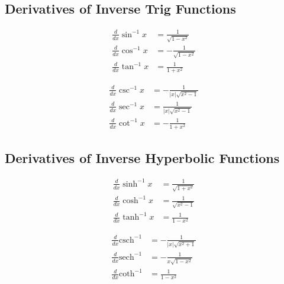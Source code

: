 \documentclass{article}
\begin{document}
\subsection{Derivatives of Inverse Trig Functions} \vspace{-2em}
\begin{multicols}{2}
    \begin{align}
        \frac{d}{dx} \sin^{-1} x &= \frac{1}{\sqrt{1-x^2}}\\
        \frac{d}{dx} \cos^{-1} x &= -\frac{1}{\sqrt{1-x^2}}\\
        \frac{d}{dx} \tan^{-1} x &= \frac{1}{1 + x^2}
    \end{align}

    \begin{align}
        \frac{d}{dx} \csc^{-1} x &= -\frac{1}{|x| \sqrt{x^2-1}}\\
        \frac{d}{dx} \sec^{-1} x &= \frac{1}{|x| \sqrt{x^2-1}}\\
        \frac{d}{dx} \cot^{-1} x &= -\frac{1}{1 + x^2}
    \end{align}    
\end{multicols}

\subsection{Derivatives of Inverse Hyperbolic Functions}
\vspace{-2em}
\begin{multicols}{2}
    \begin{align}
        \frac{d}{dx} \sinh^{-1} x &= \frac{1}{\sqrt{1+x^2}}\\
        \frac{d}{dx} \cosh^{-1} x &= \frac{1}{\sqrt{x^2 - 1}}\\
        \frac{d}{dx} \tanh^{-1} x &= \frac{1}{1-x^2}
    \end{align}

    \begin{align}
        \frac{d}{dx} \text{csch}^{-1} &= -\frac{1}{|x| \sqrt{x^2 + 1}}\\
        \frac{d}{dx} \text{sech}^{-1} &= -\frac{1}{x\sqrt{1-x^2}}\\
        \frac{d}{dx} \text{coth}^{-1} &= \frac{1}{1-x^2}
    \end{align}
\end{multicols}
\end{document}
